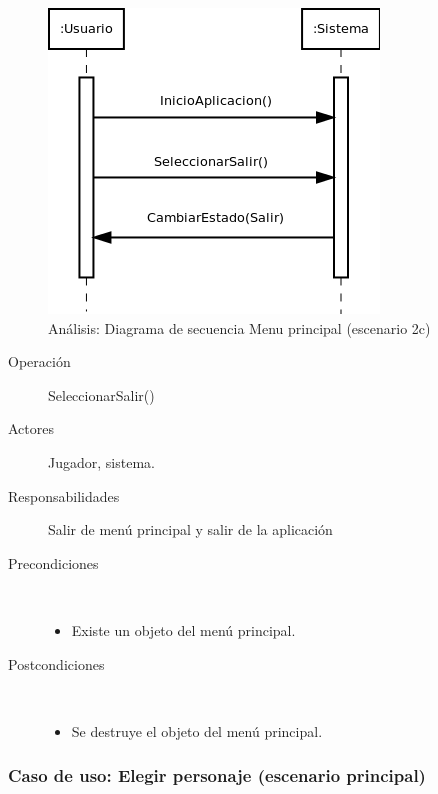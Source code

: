 \begin{figure}[H] 
  \label{secuencia_menu_principal4}
  \begin{center}
    \includegraphics[scale=0.6]{imagenes/analisis/secuencia_menu_principal4.png}
  \end{center}
  \caption{Análisis: Diagrama de secuencia Menu principal (escenario 2c)}
\end{figure}

\begin{description}
    \item [Operación] SeleccionarSalir()
    \item [Actores] Jugador, sistema.
    \item [Responsabilidades] Salir de menú principal y salir de la aplicación
    \item [Precondiciones] $\quad$
        \begin{itemize}
            \item Existe un objeto del menú principal.
        \end{itemize}
    \item [Postcondiciones] $\quad$
        \begin{itemize}
            \item Se destruye el objeto del menú principal.
        \end{itemize}
\end{description}

\subsubsection{Caso de uso: Elegir personaje (escenario principal)}

